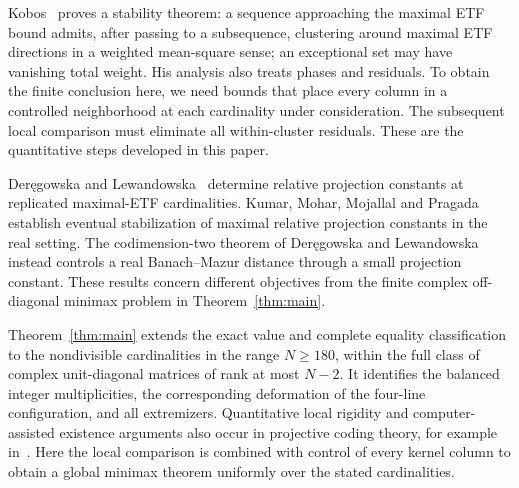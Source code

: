 Kobos~\cite[Theorem~4.2]{Kobos} proves a stability theorem: a sequence
approaching the maximal ETF bound admits, after
passing to a subsequence, clustering around maximal ETF directions in
a weighted mean-square sense; an exceptional set may have vanishing
total weight. His analysis also treats phases and residuals. To obtain
the finite conclusion here, we need bounds that place every column in
a controlled neighborhood at each cardinality under consideration.
The subsequent local comparison must eliminate all within-cluster
residuals. These are the quantitative steps developed in this paper.

Der\k{e}gowska and Lewandowska~\cite[Theorem~3.6]{DLWelch} determine
relative projection constants at replicated maximal-ETF cardinalities.
Kumar, Mohar, Mojallal and Pragada~\cite[Theorem~1.3]{KMMP} establish
eventual stabilization of maximal relative projection constants in the
real setting. The codimension-two theorem of Der\k{e}gowska and
Lewandowska~\cite[Theorem~2.4]{DLCodim} instead controls a real
Banach--Mazur distance through a small projection constant. These
results concern different objectives from the finite complex
off-diagonal minimax problem in Theorem~\ref{thm:main}.

Theorem~\ref{thm:main} extends the exact value and complete equality
classification to the nondivisible cardinalities in the range
$N\geq180$, within the full class of complex unit-diagonal matrices of
rank at most $N-2$. It identifies the balanced integer multiplicities,
the corresponding deformation of the four-line configuration, and all
extremizers. Quantitative local rigidity and computer-assisted existence
arguments also occur in projective coding theory, for example
in~\cite{CKM}. Here the local comparison is combined with control of
every kernel column to obtain a global minimax theorem uniformly over
the stated cardinalities.
